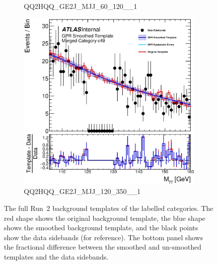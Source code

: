 \begin{figure}
\begin{center}
\begin{subfigure}[T]{0.49\linewidth}
	\caption{QQ2HQQ\_GE2J\_MJJ\_60\_120\_\_1}
\end{subfigure}
\begin{subfigure}[T]{0.49\linewidth}
	\centering
	\includegraphics[width=\linewidth]{figures/background/gpr/coupCatTemplates/GPR_Smoothed_Plot_hmgg_c49.eps}
	\caption{QQ2HQQ\_GE2J\_MJJ\_120\_350\_\_1}
\end{subfigure}
\caption{The full Run~2 background templates of the labelled categories. The red shape shows the original background template, the blue shape shows the smoothed background template, and the black points show the data sidebands (for reference). The bottom panel shows the fractional difference between the smoothed and un-smoothed templates and the data sidebands. }
 \label{fig:gpr_coupcat_12}
 \end{center}
\end{figure}

